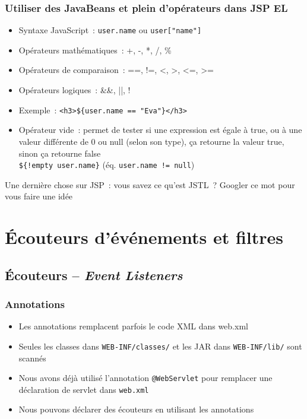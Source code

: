 \documentclass{beamer}
\begin{document}
\begin{frame}
	\frametitle{Utiliser des JavaBeans et plein d'opérateurs dans JSP EL}
	\begin{itemize}
		\item Syntaxe JavaScript~: \texttt{user.name} ou \texttt{user["name"]}
		\item Opérateurs mathématiques~: +, -, *, /, \%
		\item Opérateurs de comparaison~: ==, !=, <, >, <=, >=
		\item Opérateurs logiques~: \&\&, ||, !
		\item Exemple~: \texttt{<h3>\$\{user.name == "Eva"\}</h3>}
		\item Opérateur vide~: permet de tester si une expression est égale à true, ou à une valeur différente de 0 ou null (selon son type), ça retourne la valeur true, sinon ça retourne false\\ 
		\texttt{\$\{!empty user.name\}} (éq. \texttt{user.name != null})
		
	\end{itemize}
Une dernière chose sur JSP~: vous savez ce qu'est JSTL~? Googler ce mot pour vous faire une idée
\end{frame}

\section{Écouteurs d'événements et filtres}

\subsection{Écouteurs -- \textit{Event Listeners}}
\begin{frame}
  \frametitle{Annotations}
  \begin{itemize}
  \item Les annotations remplacent parfois le code XML dans web.xml
  \item Seules les classes dans \texttt{WEB-INF/classes/} et les JAR dans \texttt{WEB-INF/lib/} sont scannés
  \item Nous avons déjà utilisé l'annotation \texttt{@WebServlet} pour remplacer une déclaration de servlet dans \texttt{web.xml}
  \item Nous pouvons déclarer des écouteurs en utilisant les annotations
  \end{itemize}
\end{frame}
\end{document}
